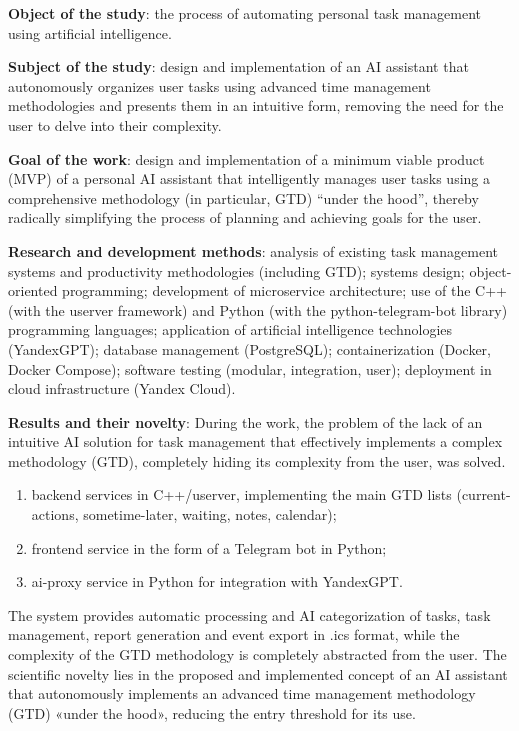 \textbf{Object of the study}: the process of automating personal task management using artificial intelligence.

\textbf{Subject of the study}: design and implementation of an AI assistant that autonomously organizes user tasks using advanced time management methodologies and presents them in an intuitive form, removing the need for the user to delve into their complexity.

\textbf{Goal of the work}: design and implementation of a minimum viable product (MVP) of a personal AI assistant that intelligently manages user tasks using a comprehensive methodology (in particular, GTD) “under the hood”, thereby radically simplifying the process of planning and achieving goals for the user.

\textbf{Research and development methods}: analysis of existing task management systems and productivity methodologies (including GTD); systems design; object-oriented programming; development of microservice architecture; use of the C++ (with the userver framework) and Python (with the python-telegram-bot library) programming languages; application of artificial intelligence technologies (YandexGPT); database management (PostgreSQL); containerization (Docker, Docker Compose); software testing (modular, integration, user); deployment in cloud infrastructure (Yandex Cloud).

\textbf{Results and their novelty}:
During the work, the problem of the lack of an intuitive AI solution for task management that effectively implements a complex methodology (GTD), completely hiding its complexity from the user, was solved.

\begin{enumerate}
\item backend services in C++/userver, implementing the main GTD lists (current-actions, sometime-later, waiting, notes, calendar);

\item frontend service in the form of a Telegram bot in Python;

\item ai-proxy service in Python for integration with YandexGPT.

\end{enumerate}

The system provides automatic processing and AI categorization of tasks, task management, report generation and event export in .ics format, while the complexity of the GTD methodology is completely abstracted from the user. The scientific novelty lies in the proposed and implemented concept of an AI assistant that autonomously implements an advanced time management methodology (GTD) «under the hood», reducing the entry threshold for its use.

